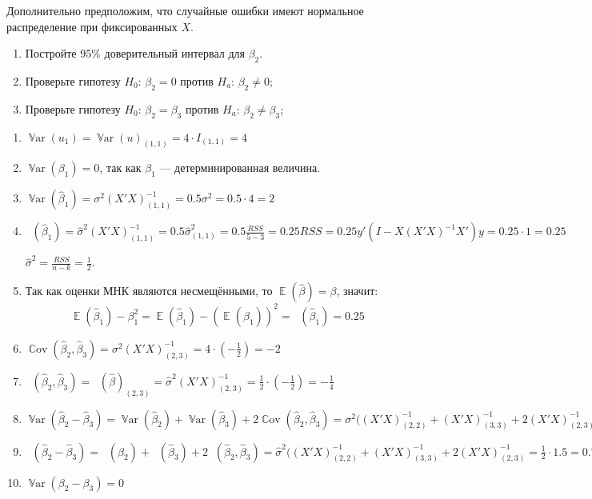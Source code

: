 \documentclass[12pt]{article}
\DeclareMathOperator{\Cov}{\mathbb{C}ov}
\DeclareMathOperator{\Var}{\mathbb{V}ar}
\DeclareMathOperator{\hVar}{\widehat{\Var}}
\DeclareMathOperator{\hCov}{\widehat{\Cov}}
\DeclareMathOperator{\E}{\mathbb{E}}
\newcommand{\hb}{\hat{\beta}}
\newcommand{\RSS}{RSS}
\newenvironment{sol}{}{}
\begin{document}
\begin{problem}
Дополнительно предположим, что случайные ошибки имеют нормальное распределение при фиксированных $X$. 


\begin{enumerate}[resume]
\item Постройте $95\%$ доверительный интервал для $\beta_2$.
\item Проверьте гипотезу  $H_0$: $\beta_2 = 0$ против $H_a$: $\beta_2 \neq 0$;
\item Проверьте гипотезу  $H_0$: $\beta_2 = \beta_3$ против $H_a$: $\beta_2 \neq \beta_3$;
\end{enumerate}


\begin{sol}
\begin{enumerate}
\item $\Var(u_1)=\Var(u)_{(1,1)}=4\cdot I_{(1,1)}=4$
\item $\Var(\beta_1)=0$, так как $\beta_1$ — детерминированная величина.
\item $\Var(\hb_1)=\sigma^2(X'X)^{-1}_{(1,1)}=0.5\sigma^2=0.5\cdot 4=2$
\item $\hVar(\hb_1)=\hat\sigma^2(X'X)^{-1}_{(1,1)}=0.5\hat\sigma^2_{(1,1)}=0.5\frac{\RSS}{5-3}=0.25\RSS=0.25y'(I-X(X'X)^{-1}X')y=0.25\cdot 1=0.25$

$\hat\sigma^2=\frac{\RSS}{n-k}=\frac12$.

\item Так как оценки МНК являются несмещёнными, то $\E(\hb)=\beta$, значит:
\[
\E(\hb_1)-\beta_1^2=\E(\hb_1)-(\E(\hb_1))^2=\hVar(\hb_1)=0.25
\]

\item $\Cov(\hb_2,\hb_3)=\sigma^2(X'X)^{-1}_{(2,3)}=4\cdot\left(-\frac12\right)=-2$
\item $\hCov(\hb_2,\hb_3)=\hVar(\hat\beta)_{(2,3)}=\hat\sigma^2(X'X)^{-1}_{(2,3)}=\frac{1}{2}\cdot\left(-\frac12\right)=-\frac14$

\item $\Var(\hb_2-\hb_3)=\Var(\hb_2)+\Var(\hb_3)+2\Cov(\hb_2,\hb_3)=\sigma^2((X'X)^{-1}_{(2,2)}+(X'X)^{-1}_{(3,3)}+2(X'X)^{-1}_{(2,3)}=4(1+1.5+2\cdot(-0.5))=6$

\item $\hVar(\hb_2-\hb_3)=\hVar(\hb_2)+\hVar(\hb_3)+2\hCov(\hb_2,\hb_3)=\hat\sigma^2((X'X)^{-1}_{(2,2)}+(X'X)^{-1}_{(3,3)}+2(X'X)^{-1}_{(2,3)}=\frac{1}{2}\cdot1.5=0.75$

\item $\Var(\beta_2-\beta_3)=0$


\end{enumerate}
\end{sol}
\end{problem}
\end{document}

